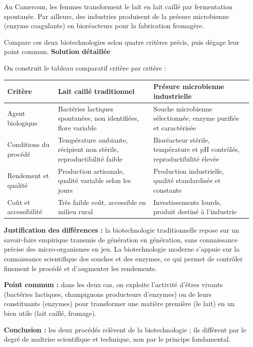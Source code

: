 \documentclass[11pt]{article}
\newcommand{\cle}[1]{{\popxbold\color{popdark}#1}}
\begin{document}
\begin{exoresolu}
Au Cameroun, les femmes transforment le lait en lait caillé par fermentation spontanée. Par ailleurs, des industries produisent de la présure microbienne (enzyme coagulante) en bioréacteurs pour la fabrication fromagère.

Compare ces deux biotechnologies selon quatre critères précis, puis dégage leur point commun.
\tcblower
\textbf{Solution détaillée}

On construit le tableau comparatif critère par critère :

\begin{center}
\begin{tabularx}{\linewidth}{|l|X|X|}
\hline
\rowcolor{popblueL} \textbf{Critère} & \textbf{Lait caillé traditionnel} & \textbf{Présure microbienne industrielle} \\
\hline
Agent biologique & Bactéries lactiques spontanées, non identifiées, flore variable & Souche microbienne sélectionnée, enzyme purifiée et caractérisée \\
\hline
Conditions du procédé & Température ambiante, récipient non stérile, reproductibilité faible & Bioréacteur stérile, température et pH contrôlés, reproductibilité élevée \\
\hline
Rendement et qualité & Production artisanale, qualité variable selon les jours & Production industrielle, qualité standardisée et constante \\
\hline
Coût et accessibilité & Très faible coût, accessible en milieu rural & Investissements lourds, produit destiné à l'industrie \\
\hline
\end{tabularx}
\end{center}

\textbf{Justification des différences :} la biotechnologie traditionnelle repose sur un savoir-faire empirique transmis de génération en génération, sans connaissance précise des micro-organismes en jeu. La biotechnologie moderne s'appuie sur la connaissance scientifique des souches et des enzymes, ce qui permet de contrôler finement le procédé et d'augmenter les rendements.

\textbf{Point commun :} dans les deux cas, on exploite l'activité d'\cle{êtres vivants} (bactéries lactiques, champignons producteurs d'enzymes) ou de leurs constituants (enzymes) pour transformer une matière première (le lait) en un bien utile (lait caillé, fromage).

\textbf{Conclusion :} les deux procédés relèvent de la biotechnologie ; ils diffèrent par le degré de maîtrise scientifique et technique, non par le principe fondamental.
\end{exoresolu}
\end{document}
